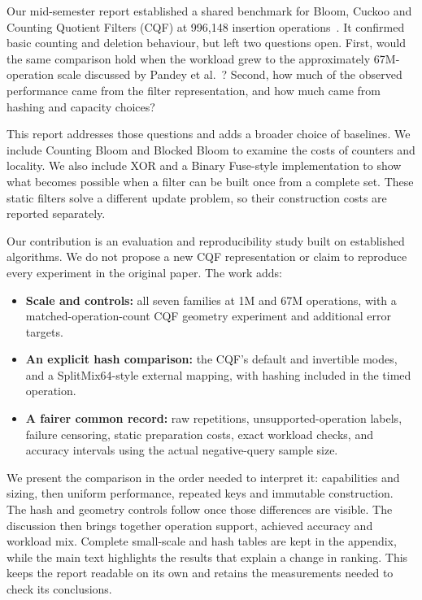 Our mid-semester report established a shared benchmark for Bloom, Cuckoo and Counting Quotient Filters (CQF) at 996,148 insertion operations~\cite{midsem}. It confirmed basic counting and deletion behaviour, but left two questions open. First, would the same comparison hold when the workload grew to the approximately 67M-operation scale discussed by Pandey et al.~\cite{pandey2017}? Second, how much of the observed performance came from the filter representation, and how much came from hashing and capacity choices?

This report addresses those questions and adds a broader choice of baselines. We include Counting Bloom and Blocked Bloom to examine the costs of counters and locality. We also include XOR and a Binary Fuse-style implementation to show what becomes possible when a filter can be built once from a complete set. These static filters solve a different update problem, so their construction costs are reported separately.

Our contribution is an evaluation and reproducibility study built on established algorithms. We do not propose a new CQF representation or claim to reproduce every experiment in the original paper. The work adds:
\begin{itemize}
\item \textbf{Scale and controls:} all seven families at 1M and 67M operations, with a matched-operation-count CQF geometry experiment and additional error targets.
\item \textbf{An explicit hash comparison:} the CQF's default and invertible modes, and a SplitMix64-style external mapping, with hashing included in the timed operation.
\item \textbf{A fairer common record:} raw repetitions, unsupported-operation labels, failure censoring, static preparation costs, exact workload checks, and accuracy intervals using the actual negative-query sample size.
\end{itemize}
We present the comparison in the order needed to interpret it: capabilities and sizing, then uniform performance, repeated keys and immutable construction. The hash and geometry controls follow once those differences are visible. The discussion then brings together operation support, achieved accuracy and workload mix. Complete small-scale and hash tables are kept in the appendix, while the main text highlights the results that explain a change in ranking. This keeps the report readable on its own and retains the measurements needed to check its conclusions.
\clearpage
